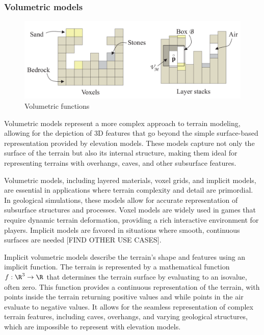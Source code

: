 \subsubsection{Volumetric models}

\begin{figure}[h]
    \centering
    \includegraphics[width = 0.8 \linewidth]{volumetric_representation.png}
    \caption{Volumetric functions}
    \label{fig:erosion_volume-representation}
\end{figure}

Volumetric models represent a more complex approach to terrain modeling, allowing for the depiction of 3D features that go beyond the simple surface-based representation provided by elevation models. These models capture not only the surface of the terrain but also its internal structure, making them ideal for representing terrains with overhangs, caves, and other subsurface features. 

Volumetric models, including layered materials, voxel grids, and implicit models, are essential in applications where terrain complexity and detail are primordial. In geological simulations, these models allow for accurate representation of subsurface structures and processes. Voxel models are widely used in games that require dynamic terrain deformation, providing a rich interactive environment for players. Implicit models are favored in situations where smooth, continuous surfaces are needed [FIND OTHER USE CASES].

Implicit volumetric models describe the terrain's shape and features using an implicit function. The terrain is represented by a mathematical function $f: \R^3 \to \R$ that determines the terrain surface by evaluating to an isovalue, often zero. This function provides a continuous representation of the terrain, with points inside the terrain returning positive values and while points in the air evaluate to negative values. It allows for the seamless representation of complex terrain features, including caves, overhangs, and varying geological structures, which are impossible to represent with  elevation models.


